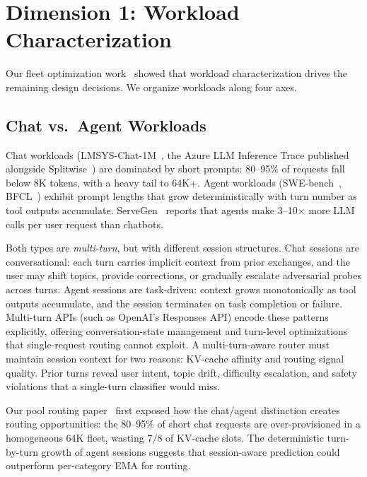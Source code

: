 \section{Dimension 1: Workload Characterization}
\label{sec:workload}

Our fleet optimization work~\cite{poolrouting2026, fleetopt2026,
fleetsim2026} showed that workload characterization drives the remaining
design decisions.  We organize workloads
along four axes.

\subsection{Chat vs.\ Agent Workloads}
\label{sec:workload:chat-agent}

Chat workloads (LMSYS-Chat-1M~\cite{zheng2024lmsys},
the Azure LLM Inference Trace published alongside
Splitwise~\cite{patel2024splitwise}) are dominated by short prompts:
80--95\% of requests fall below 8K tokens, with a heavy tail to 64K+.
Agent workloads (SWE-bench~\cite{jimenez2024swebench},
BFCL~\cite{patil2025bfcl}) exhibit prompt lengths that grow
deterministically with turn number as tool outputs accumulate.
ServeGen~\cite{servegen2025} reports that agents make 3--10$\times$
more LLM calls per user request than chatbots.

Both types are \emph{multi-turn}, but with different session
structures.  Chat sessions are conversational: each turn
carries implicit context from prior exchanges, and the user may
shift topics, provide corrections, or gradually escalate adversarial
probes across turns.  Agent sessions are task-driven: context grows
monotonically as tool outputs accumulate, and the session terminates
on task completion or failure.  Multi-turn APIs (such as OpenAI's
Responses API) encode these patterns explicitly, offering
conversation-state management and turn-level optimizations that
single-request routing cannot exploit.  A multi-turn-aware router must maintain session context for two
reasons: KV-cache affinity and routing signal quality.  Prior turns
reveal user intent, topic drift, difficulty escalation, and safety
violations that a single-turn classifier would miss.

Our pool routing paper~\cite{poolrouting2026} first exposed how
the chat/agent distinction creates routing opportunities: the
80--95\% of short chat requests are over-provisioned in a
homogeneous 64K fleet, wasting $7/8$ of KV-cache slots.  The
deterministic turn-by-turn growth of agent sessions suggests that
session-aware prediction could outperform per-category EMA for
routing.

